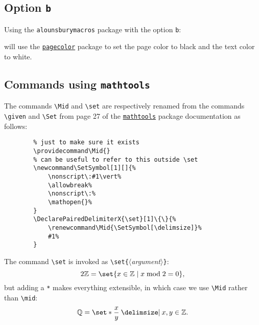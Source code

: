 \documentclass[12pt]{article}
\begin{document}
    \subsection{Option \texttt{b}}
    Using the \texttt{alounsburymacros} package with the option \texttt{b}:
    \begin{center}
    \end{center}
    will use the \href{https://ctan.org/pkg/pagecolor}{\texttt{pagecolor}} package to set the page color to black and the text color to white. 

    \subsection{Commands using \texttt{mathtools}}
    The commands \texttt{\textbackslash Mid} and \texttt{\textbackslash set} are respectively renamed from the commands \texttt{\textbackslash given} and \texttt{\textbackslash Set} from page 27 of the \href{https://ctan.org/pkg/mathtools}{\texttt{mathtools}} package documentation as follows: 
    \begin{verbatim}
        % just to make sure it exists
        \providecommand\Mid{}
        % can be useful to refer to this outside \set
        \newcommand\SetSymbol[1][]{%
            \nonscript\:#1\vert%
            \allowbreak%
            \nonscript\:%
            \mathopen{}%
        }
        \DeclarePairedDelimiterX{\set}[1]\{\}{%
            \renewcommand\Mid{\SetSymbol[\delimsize]}%
            #1%
        }
    \end{verbatim}
    The command \texttt{\textbackslash set} is invoked as \texttt{\textbackslash set\{}$\langle$\textit{argument}$\rangle$\texttt{\}}: 
    \[
        2\Z = \set{x \in \Z \mid x \bmod 2 = 0}, 
    \]
    but adding a \texttt{*} makes everything extensible, in which case we use \texttt{\textbackslash Mid} rather than \texttt{\textbackslash mid}: 
    \[
        \Q = \set*{\f{x}{y} \Mid x,y \in \Z}. 
    \]
\end{document}
